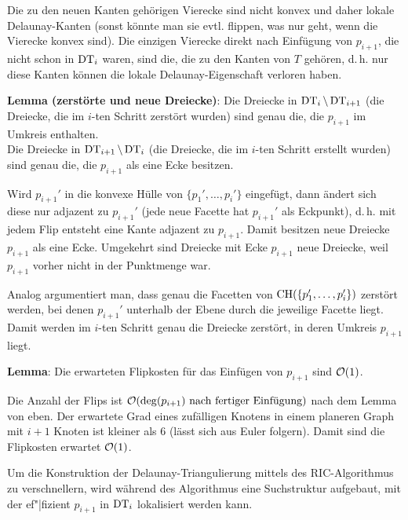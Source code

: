 \begin{Beweis}
    Die zu den neuen Kanten gehörigen Vierecke sind nicht konvex
    und daher lokale Delaunay-Kanten (sonst könnte man sie evtl. flippen, was nur geht, wenn
    die Vierecke konvex sind).
    Die einzigen Vierecke direkt nach Einfügung von $p_{i+1}$, die nicht schon in $\operatorname{DT}_i$ waren,
    sind die, die zu den Kanten von $T$ gehören,
    d.\,h. nur diese Kanten können die lokale Delaunay-Eigenschaft verloren haben.
\end{Beweis}

\textbf{Lemma (zerstörte und neue Dreiecke)}:
Die Dreiecke in $\operatorname{DT}_i \setminus \operatorname{DT}_{i+1}$
(die Dreiecke, die im $i$-ten Schritt zerstört wurden)
sind genau die, die $p_{i+1}$ im Umkreis enthalten.\\
Die Dreiecke in $\operatorname{DT}_{i+1} \setminus \operatorname{DT}_i$
(die Dreiecke, die im $i$-ten Schritt erstellt wurden)
sind genau die, die $p_{i+1}$ als eine Ecke besitzen.

\begin{Beweis}
    Wird $p_{i+1}'$ in die konvexe Hülle von $\{p_1', \dotsc, p_i'\}$ eingefügt,
    dann ändert sich diese nur adjazent zu $p_{i+1}'$
    (jede neue Facette hat $p_{i+1}'$ als Eckpunkt),
    d.\,h. mit jedem Flip entsteht eine Kante adjazent zu $p_{i+1}$.
    Damit besitzen neue Dreiecke $p_{i+1}$ als eine Ecke.
    Umgekehrt sind Dreiecke mit Ecke $p_{i+1}$ neue Dreiecke, weil $p_{i+1}$ vorher nicht in der
    Punktmenge war.

    Analog argumentiert man, dass genau die Facetten von $\operatorname{CH}(\{p_1', \dotsc, p_i'\})$
    zerstört werden, bei denen $p_{i+1}'$ unterhalb der Ebene durch die jeweilige Facette liegt.
    Damit werden im $i$-ten Schritt genau die Dreiecke zerstört, in deren Umkreis $p_{i+1}$
    liegt.
\end{Beweis}

\textbf{Lemma}:
Die erwarteten Flipkosten für das Einfügen von $p_{i+1}$ sind $\mathcal{O}(1)$.

\begin{Beweis}
    Die Anzahl der Flips ist $\mathcal{O}(\text{$\deg(p_{i+1})$ nach fertiger Einfügung})$
    nach dem Lemma von eben.
    Der erwartete Grad eines zufälligen Knotens in einem planeren Graph mit $i + 1$ Knoten ist
    kleiner als $6$ (lässt sich aus Euler folgern).
    Damit sind die Flipkosten erwartet $\mathcal{O}(1)$.
\end{Beweis}

\linie
\pagebreak

Um die Konstruktion der Delaunay-Triangulierung mittels des RIC-Algorithmus zu verschnellern,
wird während des Algorithmus eine Suchstruktur aufgebaut, mit der ef"|fizient $p_{i+1}$ in
$\operatorname{DT}_i$ lokalisiert werden kann.

